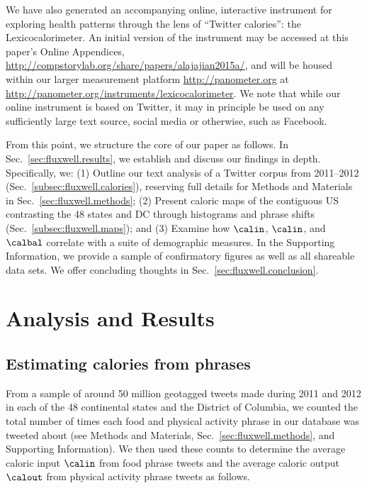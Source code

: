 We have also generated an accompanying online, interactive
instrument for exploring health patterns through the lens of ``Twitter
calories'': the Lexicocalorimeter.
An initial version of the instrument may be accessed at this paper's
Online Appendices,
\url{http://compstorylab.org/share/papers/alajajian2015a/},
and will be housed within our larger
measurement platform \url{http://panometer.org}
at 
\url{http://panometer.org/instruments/lexicocalorimeter}.
We note that while our online instrument is based on Twitter, it may in principle
be used on any sufficiently large text source, social media or
otherwise, such as Facebook.

From this point, we structure the core of our paper as follows.
In Sec.~\ref{sec:fluxwell.results},
we establish and discuss our findings in depth.
Specifically, we:
(1) Outline our text analysis of a Twitter corpus from 2011--2012
(Sec.~\ref{subsec:fluxwell.calories}),
reserving full details for Methods and Materials in Sec.~\ref{sec:fluxwell.methods};
(2) Present caloric maps of the contiguous US
contrasting the 48 states and DC
through histograms and phrase shifts
(Sec.~\ref{subsec:fluxwell.maps});
and 
(3) Examine how  $\calin$, $\calin$, and $\calbal$
correlate with a suite of demographic measures.
In the Supporting Information, 
we provide a sample of confirmatory figures 
as well as all shareable data sets.
We offer concluding thoughts in Sec.~\ref{sec:fluxwell.conclusion}.

\section*{Analysis and Results}
\label{sec:fluxwell.results}

\subsection*{Estimating calories from phrases}
\label{subsec:fluxwell.calories}

From a sample of around 50 million geotagged tweets 
made during 2011 and 2012 in each of the 48
continental states and the District of Columbia, 
we counted the total number of times each food and physical activity
phrase in our database was tweeted about (see Methods and Materials,
Sec.~\ref{sec:fluxwell.methods}, and Supporting Information).  
We then used these counts to determine the average caloric input $\calin$
from food phrase tweets
and the average caloric output $\calout$
from physical activity phrase tweets as follows.

